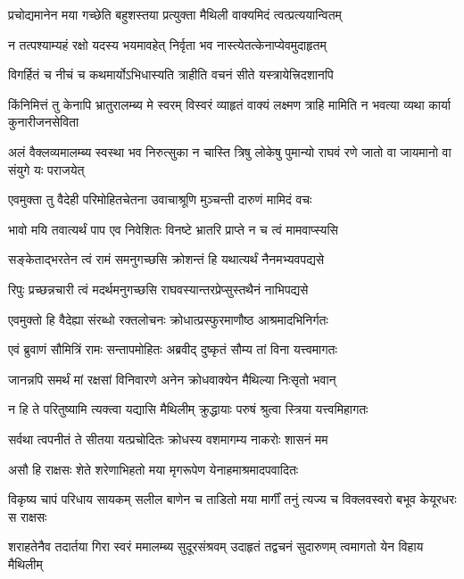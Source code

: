 \twolineshloka
{प्रचोद्यमानेन मया गच्छेति बहुशस्तया}
{प्रत्युक्ता मैथिली वाक्यमिदं त्वत्प्रत्ययान्वितम्} %

\twolineshloka
{न तत्पश्याम्यहं रक्षो यदस्य भयमावहेत्}
{निर्वृता भव नास्त्येतत्केनाप्येवमुदाहृतम्} %

\twolineshloka
{विगर्हितं च नीचं च कथमार्योऽभिधास्यति}
{त्राहीति वचनं सीते यस्त्रायेत्त्रिदशानपि} %

\threelineshloka
{किंनिमित्तं तु केनापि भ्रातुरालम्ब्य मे स्वरम्}
{विस्वरं व्याहृतं वाक्यं लक्ष्मण त्राहि मामिति}
{न भवत्या व्यथा कार्या कुनारीजनसेविता} %

\threelineshloka
{अलं वैक्लव्यमालम्ब्य स्वस्था भव निरुत्सुका}
{न चास्ति त्रिषु लोकेषु पुमान्यो राघवं रणे}
{जातो वा जायमानो वा संयुगे यः पराजयेत्} %

\twolineshloka
{एवमुक्ता तु वैदेही परिमोहितचेतना}
{उवाचाश्रूणि मुञ्चन्ती दारुणं मामिदं वचः} %

\twolineshloka
{भावो मयि तवात्यर्थं पाप एव निवेशितः}
{विनष्टे भ्रातरि प्राप्ते न च त्वं मामवाप्स्यसि} %

\twolineshloka
{सङ्केताद्भरतेन त्वं रामं समनुगच्छसि}
{क्रोशन्तं हि यथात्यर्थं नैनमभ्यवपद्यसे} %

\twolineshloka
{रिपुः प्रच्छन्नचारी त्वं मदर्थमनुगच्छसि}
{राघवस्यान्तरप्रेप्सुस्तथैनं नाभिपद्यसे} %

\twolineshloka
{एवमुक्तो हि वैदेह्या संरब्धो रक्तलोचनः}
{क्रोधात्प्रस्फुरमाणौष्ठ आश्रमादभिनिर्गतः} %

\twolineshloka
{एवं ब्रुवाणं सौमित्रिं रामः सन्तापमोहितः}
{अब्रवीद्  दुष्कृतं सौम्य तां विना यत्त्वमागतः} %

\twolineshloka
{जानन्नपि समर्थं मां रक्षसां विनिवारणे}
{अनेन क्रोधवाक्येन मैथिल्या निःसृतो भवान्} %

\twolineshloka
{न हि ते परितुष्यामि त्यक्त्वा यद्यासि मैथिलीम्}
{क्रुद्धायाः परुषं श्रुत्वा स्त्रिया यत्त्वमिहागतः} %

\twolineshloka
{सर्वथा त्वपनीतं ते सीतया यत्प्रचोदितः}
{क्रोधस्य वशमागम्य नाकरोः शासनं मम} %

\twolineshloka
{असौ हि राक्षसः शेते शरेणाभिहतो मया}
{मृगरूपेण येनाहमाश्रमादपवादितः} %

\fourlineindentedshloka
{विकृष्य चापं परिधाय सायकम्}
{सलील बाणेन च ताडितो मया}
{मार्गीं तनुं त्यज्य च विक्लवस्वरो}
{बभूव केयूरधरः स राक्षसः} %

\fourlineindentedshloka
{शराहतेनैव तदार्तया गिरा}
{स्वरं ममालम्ब्य सुदूरसंश्रवम्}
{उदाहृतं तद्वचनं सुदारुणम्}
{त्वमागतो येन विहाय मैथिलीम्} %


